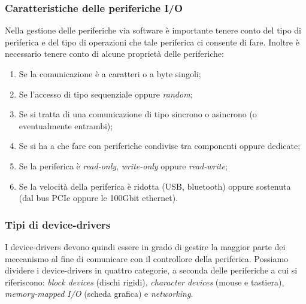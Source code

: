 \subsubsection{Caratteristiche delle periferiche I/O} 
Nella gestione delle periferiche via software è importante tenere conto del tipo di periferica e del tipo di operazioni che tale periferica ci consente di fare. Inoltre è necessario tenere conto di alcune proprietà delle periferiche:
\vspace{-5px}
\begin{enumerate}
\setlength{\itemsep}{-.15 em}
    \item Se la comunicazione è a caratteri o a byte singoli;
    \item Se l'accesso di tipo sequenziale oppure \textit{random};
    \item Se si tratta di una comunicazione di tipo sincrono o asincrono (o eventualmente entrambi);
    \item Se si ha a che fare con periferiche condivise tra componenti oppure dedicate;
    \item Se la periferica è \textit{read-only}, \textit{write-only} oppure \textit{read-write};
    \item Se la velocità della periferica è ridotta (USB, bluetooth) oppure sostenuta (dal bus PCIe oppure le 100Gbit ethernet).
\end{enumerate}

% 
\subsubsection{Tipi di device-drivers}
I device-drivers devono quindi essere in grado di gestire la maggior parte dei meccanismo al fine di comunicare con il controllore della periferica. Possiamo dividere i device-drivers in quattro categorie, a seconda delle periferiche a cui si riferiscono: \textit{block devices} (dischi rigidi), \textit{character devices} (mouse e tastiera), \textit{memory-mapped I/O} (scheda grafica) e \textit{networking}.


